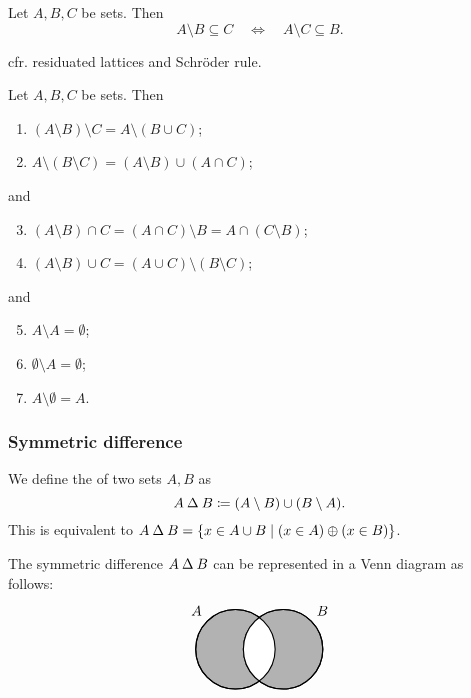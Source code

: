 \begin{proposition} \label{residuationSetBooleanLattice}
Let $A,B,C$ be sets. Then
\[ A\setminus B \subseteq C \quad\iff\quad A\setminus C\subseteq B. \]
\end{proposition}
cfr. residuated lattices and Schröder rule.


\begin{lemma} \label{differenceProperties}
Let $A,B,C$ be sets. Then
\begin{enumerate}
\item $(A\setminus B)\setminus C = A\setminus (B\cup C)$;
\item $A\setminus (B\setminus C) = (A\setminus B) \cup (A\cap C)$;
\end{enumerate}
and
\begin{enumerate} \setcounter{enumi}{2}
\item $(A\setminus B)\cap C = (A\cap C)\setminus B = A\cap (C\setminus B)$;
\item $(A\setminus B)\cup C = (A\cup C)\setminus (B\setminus C)$;
\end{enumerate}
and
\begin{enumerate} \setcounter{enumi}{4}
\item $A\setminus A = \emptyset$;
\item $\emptyset\setminus A = \emptyset$;
\item $A\setminus \emptyset = A$.
\end{enumerate}
\end{lemma}

\subsubsection{Symmetric difference}
\begin{definition}
We define the  of two sets $A,B$ as
\[ A \mathbin{\Delta} B \coloneqq (A\setminus B)\cup(B\setminus A). \]
This is equivalent to $A\mathbin{\Delta} B = \left\{ x\in A\cup B \;\middle|\; (x\in A)\oplus (x\in B) \right\}$.
\end{definition}

The symmetric difference $A\mathbin{\Delta} B$ can be represented in a Venn diagram as follows:
\[ \begin{tikzpicture}[thick,
    set/.style = {circle,
        minimum size = 2cm}]

\node[set,draw,fill=black!30,label={135:$A$}] (A) at (0,0) {};

\node[set,draw,fill=black!30,label={45:$B$}] (B) at (1.2,0) {};

\begin{scope}
    \clip (0,0) circle(1cm);
    \clip (1.2,0) circle(1cm);
    \fill[white](0,0) circle(1cm);
\end{scope}

\draw (0,0) circle(1cm);
\draw (1.2,0) circle(1cm);
\end{tikzpicture} \]

